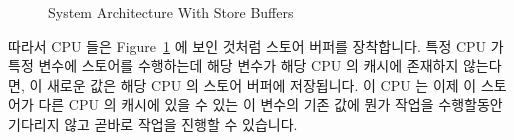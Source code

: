 \begin{figure}[tb]
\centering
{}
\caption{System Architecture With Store Buffers}
\label{fig:memorder:System Architecture With Store Buffers}
\end{figure}

따라서 CPU 들은
Figure~\ref{fig:memorder:System Architecture With Store Buffers} 에 보인 것처럼
스토어 버퍼를 장착합니다.
특정 CPU 가 특정 변수에 스토어를 수행하는데 해당 변수가 해당 CPU 의 캐시에
존재하지 않는다면, 이 새로운 값은 해당 CPU 의 스토어 버퍼에 저장됩니다.
이 CPU 는 이제 이 스토어가 다른 CPU 의 캐시에 있을 수 있는 이 변수의 기존 값에
뭔가 작업을 수행할동안 기다리지 않고 곧바로 작업을 진행할 수 있습니다.

